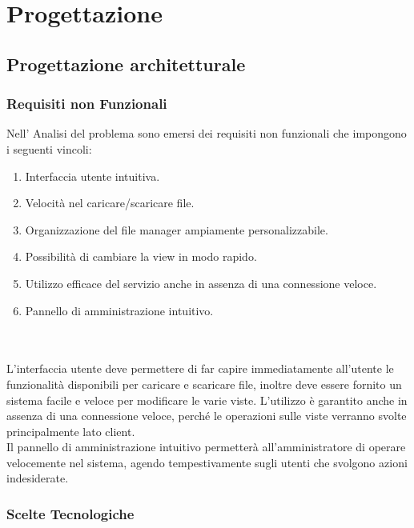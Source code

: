
\chapter*{Progettazione}
\section*{Progettazione architetturale}
\vspace{0.5cm}

\subsection*{Requisiti non Funzionali}
\vspace{0.5cm}
Nell' Analisi del problema sono emersi dei requisiti non funzionali che impongono i seguenti vincoli:

\begin{enumerate}
\item Interfaccia utente intuitiva.
\item Velocità nel caricare/scaricare file.
\item Organizzazione del file manager ampiamente personalizzabile.
\item Possibilità di cambiare la view in modo rapido.
\item Utilizzo efficace del servizio anche in assenza di una connessione veloce.
\item Pannello di amministrazione intuitivo.
\end{enumerate}
\\
\\
L'interfaccia utente deve permettere di far capire immediatamente all'utente le funzionalità disponibili per caricare e scaricare file, inoltre deve essere fornito un sistema facile e veloce per modificare le varie viste. L'utilizzo è garantito anche in assenza di una connessione veloce, perché le operazioni sulle viste verranno svolte principalmente lato client.\\
Il pannello di amministrazione intuitivo permetterà all'amministratore di operare velocemente nel sistema, agendo tempestivamente sugli utenti che svolgono azioni indesiderate.


\subsection*{Scelte Tecnologiche}

